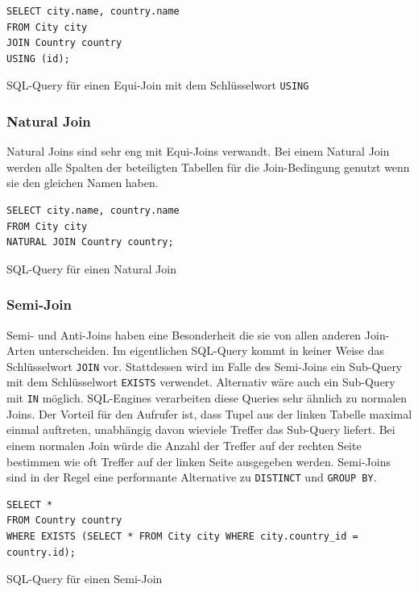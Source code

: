 \documentclass[a4paper]{article}
\begin{document}
\begin{listing}[H]
\begin{verbatim}
SELECT city.name, country.name 
FROM City city
JOIN Country country 
USING (id);
\end{verbatim}
\caption{SQL-Query für einen Equi-Join mit dem Schlüsselwort \texttt{USING}}
\label{lst:equi-join-using}
\end{listing}

\subsubsection{Natural Join}
\label{sec:natural-join}
Natural Joins sind sehr eng mit Equi-Joins verwandt. Bei einem Natural Join werden alle Spalten der beteiligten Tabellen für die Join-Bedingung genutzt wenn sie den gleichen Namen haben.

\begin{listing}[H]
\begin{verbatim}
SELECT city.name, country.name 
FROM City city
NATURAL JOIN Country country;
\end{verbatim}
\caption{SQL-Query für einen Natural Join}
\label{lst:natural-join}
\end{listing}

\newpage
\subsubsection{Semi-Join}
Semi- und Anti-Joins haben eine Besonderheit die sie von allen anderen Join-Arten unterscheiden. Im eigentlichen SQL-Query kommt in keiner Weise das Schlüsselwort \texttt{JOIN} vor. Stattdessen wird im Falle des Semi-Joins ein Sub-Query mit dem Schlüsselwort \texttt{EXISTS} verwendet. Alternativ wäre auch ein Sub-Query mit \texttt{IN} möglich. SQL-Engines verarbeiten diese Queries sehr ähnlich zu normalen Joins. Der Vorteil für den Aufrufer ist, dass Tupel aus der linken Tabelle maximal einmal auftreten, unabhängig davon wieviele Treffer das Sub-Query liefert. Bei einem normalen Join würde die Anzahl der Treffer auf der rechten Seite bestimmen wie oft Treffer auf der linken Seite ausgegeben werden. Semi-Joins sind in der Regel eine performante Alternative zu \texttt{DISTINCT} und \texttt{GROUP BY}.

\begin{listing}[H]
\begin{verbatim}
SELECT *
FROM Country country
WHERE EXISTS (SELECT * FROM City city WHERE city.country_id = country.id);
\end{verbatim}
\caption{SQL-Query für einen Semi-Join}
\label{lst:semi-join}
\end{listing}
\end{document}
